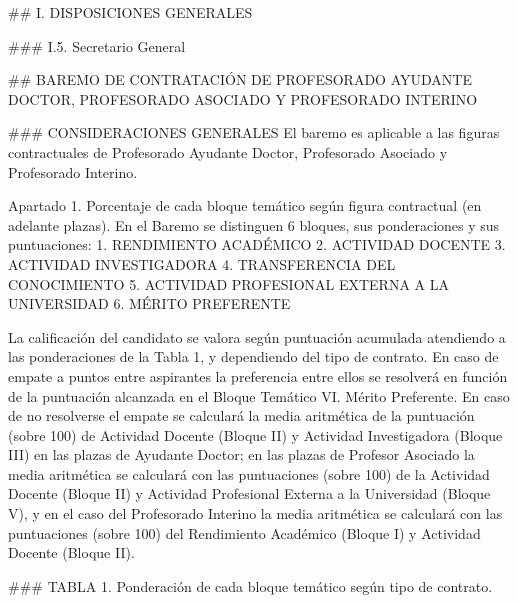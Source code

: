 \documentclass{article}
\begin{document}
\begin{itemize}
\begin{itemize}
\begin{scriptsize}
                  \#\# I. DISPOSICIONES GENERALES

                  \#\#\# I.5. Secretario General

                  \#\# BAREMO DE CONTRATACIÓN DE PROFESORADO AYUDANTE DOCTOR, PROFESORADO ASOCIADO Y PROFESORADO INTERINO

                  \#\#\# CONSIDERACIONES GENERALES
                  El baremo es aplicable a las figuras contractuales de Profesorado Ayudante Doctor, Profesorado Asociado y Profesorado Interino.

                  Apartado 1. Porcentaje de cada bloque temático según figura contractual (en adelante plazas).
                  En el Baremo se distinguen 6 bloques, sus ponderaciones y sus puntuaciones:
                  1. RENDIMIENTO ACADÉMICO
                  2. ACTIVIDAD DOCENTE
                  3. ACTIVIDAD INVESTIGADORA
                  4. TRANSFERENCIA DEL CONOCIMIENTO
                  5. ACTIVIDAD PROFESIONAL EXTERNA A LA UNIVERSIDAD
                  6. MÉRITO PREFERENTE

                  La calificación del candidato se valora según puntuación acumulada atendiendo a las ponderaciones de la Tabla 1, y dependiendo del tipo de contrato. En caso de empate a puntos entre aspirantes la preferencia entre ellos se resolverá en función de la puntuación alcanzada en el Bloque Temático VI. Mérito Preferente. En caso de no resolverse el empate se calculará la media aritmética de la puntuación (sobre 100) de Actividad Docente (Bloque II) y Actividad Investigadora (Bloque III) en las plazas de Ayudante Doctor; en las plazas de Profesor Asociado la media aritmética se calculará con las puntuaciones (sobre 100) de la Actividad Docente (Bloque II) y Actividad Profesional Externa a la Universidad (Bloque V), y en el caso del Profesorado Interino la media aritmética se calculará con las puntuaciones (sobre 100) del Rendimiento Académico (Bloque I) y Actividad Docente (Bloque II).

                  \#\#\# TABLA 1. Ponderación de cada bloque temático según tipo de contrato.


\end{scriptsize}
\end{itemize}
\end{itemize}
\end{document}
